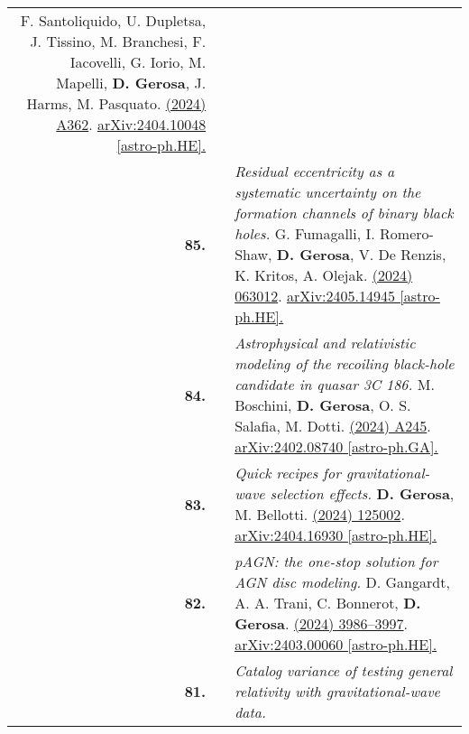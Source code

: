 {\begin{longtable}{rp{0.3cm}p{15.8cm}}
\newline{}
F. Santoliquido, U. Dupletsa, J. Tissino, M. Branchesi, F. Iacovelli, G. Iorio, M. Mapelli, \textbf{D. Gerosa}, J. Harms, M. Pasquato.
\newline{}
\href{https://doi.org/10.1051/0004-6361/202450381}{\aap 690 (2024) A362}. \href{https://arxiv.org/abs/2404.10048}{arXiv:2404.10048 [astro-ph.HE].}
\vspace{0.09cm}\\
%
\textbf{85.} & & \textit{Residual eccentricity as a systematic uncertainty on the formation channels of binary black holes.}
\newline{}
G. Fumagalli, I. Romero-Shaw, \textbf{D. Gerosa}, V. De Renzis, K. Kritos, A. Olejak.
\newline{}
\href{https://journals.aps.org/prd/abstract/10.1103/PhysRevD.110.063012}{\prd 110 (2024) 063012}. \href{https://arxiv.org/abs/2405.14945}{arXiv:2405.14945 [astro-ph.HE].}
\vspace{0.09cm}\\
%
\textbf{84.} & & \textit{Astrophysical and relativistic modeling of the recoiling black-hole candidate in quasar 3C 186.}
\newline{}
M. Boschini, \textbf{D. Gerosa}, O. S. Salafia, M. Dotti.
\newline{}
\href{https://doi.org/10.1051/0004-6361/202449596}{\aap 686 (2024) A245}. \href{https://arxiv.org/abs/2402.08740}{arXiv:2402.08740 [astro-ph.GA].}
\vspace{0.09cm}\\
%
\textbf{83.} & & \textit{Quick recipes for gravitational-wave selection effects.}
\newline{}
\textbf{D. Gerosa}, M. Bellotti.
\newline{}
\href{https://iopscience.iop.org/article/10.1088/1361-6382/ad4509}{\cqg 41 (2024) 125002}. \href{https://arxiv.org/abs/2404.16930}{arXiv:2404.16930 [astro-ph.HE].}
\vspace{0.09cm}\\
%
\textbf{82.} & & \textit{pAGN: the one-stop solution for AGN disc modeling.}
\newline{}
D. Gangardt, A. A. Trani, C. Bonnerot, \textbf{D. Gerosa}.
\newline{}
\href{https://doi.org/10.1093/mnras/stae1117}{\mnras 530 (2024) 3986–3997}. \href{https://arxiv.org/abs/2403.00060}{arXiv:2403.00060 [astro-ph.HE].}
\vspace{0.09cm}\\
%
\textbf{81.} & & \textit{Catalog variance of testing general relativity with gravitational-wave data.}

\end{longtable}}
